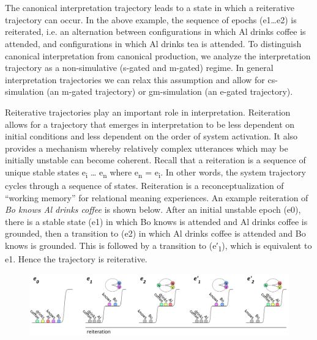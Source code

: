 \ea%
    \label{ex:key:5}
    \gll\\
        \\
    \glt
    \z

         The canonical interpretation trajectory leads to a state in which a reiterative trajectory can occur. In the above example, the sequence of epochs (e1…e2) is reiterated, i.e. an alternation between configurations in which {\textbar}Al drinks coffee{\textbar} is attended, and configurations in which {\textbar}Al drinks tea{\textbar} is attended. To distinguish canonical interpretation from canonical production, we analyze the interpretation trajectory as a non-simulative (s-gated and m-gated) regime. In general interpretation trajectories we can relax this assumption and allow for cs-simulation (an m-gated trajectory) or gm-simulation (an e-gated trajectory).

  Reiterative trajectories play an important role in interpretation. Reiteration allows for a trajectory that emerges in interpretation to be less dependent on initial conditions and less dependent on the order of system activation. It also provides a mechanism whereby relatively complex utterances which may be initially unstable can become coherent. Recall that a reiteration is a sequence of unique stable states e\textsubscript{i} … e\textsubscript{n} where e\textsubscript{n} = e\textsubscript{i}. In other words, the system trajectory cycles through a sequence of states. Reiteration is a reconceptualization of “working memory” for relational meaning experiences. An example reiteration of \textit{Bo knows Al drinks coffee} is shown below. After an initial unstable epoch (e0), there is a stable state (e1) in which {\textbar}Bo knows{\textbar} is attended and {\textbar}Al drinks coffee{\textbar} is grounded, then a transition to (e2) in which {\textbar}Al drinks coffee{\textbar} is attended and {\textbar}Bo knows{\textbar} is grounded. This is followed by a transition to (e′\textsubscript{1}), which is equivalent to e1. Hence the trajectory is reiterative.

  
\begin{figure}
\includegraphics[width=\textwidth]{figures/Tilsen-img122.png}
\caption{\missingcaption}
\label{fig:}
\end{figure}
 

